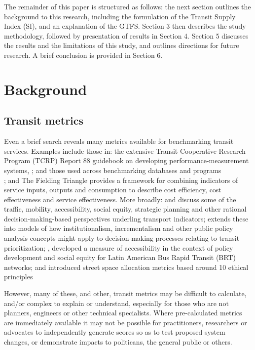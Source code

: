 \documentclass[preprint, 3p,
authoryear]{elsarticle} %
\begin{document}
The remainder of this paper is structured as follows: the next section
outlines the background to this research, including the formulation of
the Transit Supply Index (SI), and an explanation of the GTFS. Section 3
then describes the study methodology, followed by presentation of
results in Section 4. Section 5 discusses the results and the
limitations of this study, and outlines directions for future research.
A brief conclusion is provided in Section 6.

\hypertarget{background}{%
\section{Background}\label{background}}

\hypertarget{transit-metrics}{%
\subsection{Transit metrics}\label{transit-metrics}}

Even a brief search reveals many metrics available for benchmarking
transit services. Examples include those in: the extensive Transit
Cooperative Research Program (TCRP) Report 88 guidebook on developing
performance-measurement systems, \citep{Ryus:2003aa}; and those used
across benchmarking databases and programs\\
\citep{Florida-Transit-Information-System:2018aa, UITP:2015aa, Imperial-College-London:2023aa};
and The Fielding Triangle \citep{FieldingGordonJ1987Mpts} provides a
framework for combining indicators of service inputs, outputs and
consumption to describe cost efficiency, cost effectiveness and service
effectiveness. More broadly: \citet{Litman:2003ab} and
\citet{Litman:2016aa} discuss some of the traffic, mobility,
accessibility, social equity, strategic planning and other rational
decision-making-based perspectives underling transport indicators;
\citet{Reynolds:2017ah} extends these into models of how
institutionalism, incrementalism and other public policy analysis
concepts might apply to decision-making processes relating to transit
prioritization; \citet{GuzmanLuisA.2017Aeit}, developed a measure of
accessibility in the context of policy development and social equity for
Latin American Bus Rapid Transit (BRT) networks; and
\citet{Creutzig2020streetspaceallocation} introduced street space
allocation metrics based around 10 ethical principles

However, many of these, and other, transit metrics may be difficult to
calculate, and/or complex to explain or understand, especially for those
who are not planners, engineers or other technical specialists. Where
pre-calculated metrics are immediately available it may not be possible
for practitioners, researchers or advocates to independently generate
scores so as to test proposed system changes, or demonstrate impacts to
politicans, the general public or others.
\end{document}
